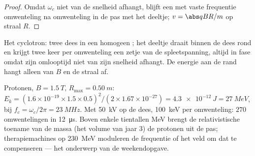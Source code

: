 \begin{proof}
Omdat $\omega_c$ niet van de snelheid afhangt, blijft een  met vaste
frequentie omwenteling na omwenteling in de pas met het deeltje; $v = \abs qBR/m$ op straal
$R$.
\end{proof}

\begin{omfigure}

{\small Het cyclotron: twee dees in een homogeen ; het
deeltje draait binnen de dees rond en krijgt twee keer per omwenteling een zetje
van de spleetspanning, altijd in fase omdat zijn omlooptijd niet van zijn
snelheid afhangt. De energie aan de rand hangt alleen van $B$ en de straal af.}
\end{omfigure}

\begin{example}\label{ex:b1:charged-particles:medical}
Protonen, $B = \qty{1.5}{T}$, $R_{\max} = \qty{0.50}{m}$: $E_k =
(1.6\times10^{-19} \times 1.5 \times 0.5)^2/(2 \times 1.67\times10^{-27}) =
\qty{4.3e-12}{J} = \qty{27}{MeV}$, bij $f_c = \omega_c/2\pi = \qty{23}{MHz}$.
Met \qty{50}{kV} op de dees, \qty{100}{keV} per omwenteling: $270$ omwentelingen in
\qty{12}{\micro s}. Boven enkele tientallen MeV brengt de relativistische toename van
de massa (het volume van jaar 3) de protonen uit de pas; therapiemachines
op \qty{230}{MeV} moduleren de frequentie of het veld om dat te compenseren ---
het onderwerp van de weekendopgave.
\end{example}


